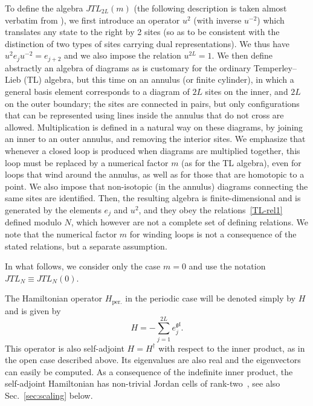 \documentclass[11pt]{article}
\newcommand{\JTL}[1]{JTL_{#1}}
\newcommand{\gl}{\mathfrak{gl}}
\theoremstyle{definition}
\begin{document}
To define the algebra $\JTL{2L}(m)$ (the following description is taken
almost verbatim
from \cite{ReadSaleur07-1}), we first introduce an operator $u^2$
(with inverse $u^{-2}$) which translates any state to the right by 2
sites (so as to be consistent with the distinction of two types of
sites carrying dual representations). We thus have $u^2e_ju^{-2}=
e_{j+2}$ and we also impose the relation $u^{2L} = 1$.  We then define
abstractly an algebra of diagrams as is customary for the ordinary
Temperley--Lieb (TL) algebra, but this time on an annulus (or finite
cylinder), in which a general basis element corresponds to a diagram
of $2L$ sites on the inner, and $2L$ on the outer boundary; the sites
are connected in pairs, but only configurations that can be
represented using lines inside the annulus that do not cross are
allowed.
Multiplication is defined in a natural way on these
diagrams, by joining an inner to an outer annulus, and removing the
interior sites. We emphasize that whenever a closed loop is produced
when diagrams are multiplied together, this loop must be replaced by a
numerical factor $m$ (as for the TL algebra), even for loops that wind
around the annulus, as well as for those that are homotopic to a
point. We also impose that non-isotopic (in the annulus) diagrams connecting  the same sites
 are identified. Then, the resulting algebra  is finite-dimensional
 and is generated by the elements $e_j$ and $u^2$, and
they obey the relations~\eqref{TL-rel1} defined modulo $N$, which
however are not a complete set of defining relations.  We note that the
numerical factor $m$ for winding loops is not a consequence of the
stated relations, but a separate assumption.

In what follows, we consider only the case $m=0$ and use the notation $\JTL{N}\equiv\JTL{N}(0)$.

\medskip

The Hamiltonian operator $H_{\mathrm{per.}}$ in the periodic case will
 be denoted simply by $H$
 and is given by
 \begin{equation}\label{hamil-def}
 H=-\sum_{j=1}^{2L}e^{\gl}_j.
 \end{equation}
This operator is also self-adjoint $H=H^{\dagger}$ with respect to the
inner product, as in the open case described above.  Its eigenvalues
are also real and the eigenvectors can easily be computed. As a
consequence of the indefinite inner product, the self-adjoint
Hamiltonian has non-trivial Jordan cells of rank-two~\cite{GRS1}, see
also Sec.~\ref{sec:scaling} below.
\end{document}
